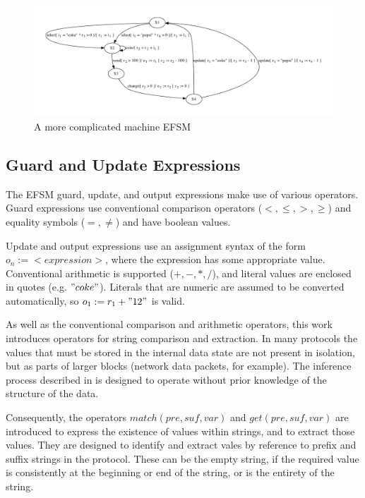 \begin{figure}[h]
\begin{center}
\includegraphics[width=13cm]{figures/efsm/vend-complicated.pdf}
\caption{A more complicated machine EFSM}
\label{fig:vendcomplicated}
\end{center}
\end{figure}

\subsection{Guard and Update Expressions}
\label{Expressions}

The EFSM guard, update, and output expressions make use of various operators. Guard expressions use conventional comparison operators ($<, \leq, >, \geq$) and equality symbols ($=, \neq$) and have boolean values.

Update and output expressions use an assignment syntax of the form $o_n := <expression>$, where the expression has some appropriate value. Conventional arithmetic is supported ($+,-,*,/$), and literal values are enclosed in quotes (e.g. $"coke"$). Literals that are numeric are assumed to be converted automatically, so $o_1 := r_1 + "12"$ is valid. 

As well as the conventional comparison and arithmetic operators, this work introduces operators for string comparison and extraction. In many protocols the values that must be stored in the internal data state are not present in isolation, but as parts of larger blocks (network data packets, for example). The inference process described in  is designed to operate without prior knowledge of the structure of the data. 

Consequently, the operators $match(pre,suf,var)$ and $get(pre,suf,var)$ are introduced to express the existence of values within strings, and to extract those values. They are designed to identify and extract vales by reference to prefix and suffix strings in the protocol. These can be the empty string, if the required value is consistently at the beginning or end of the string, or is the entirety of the string. 

